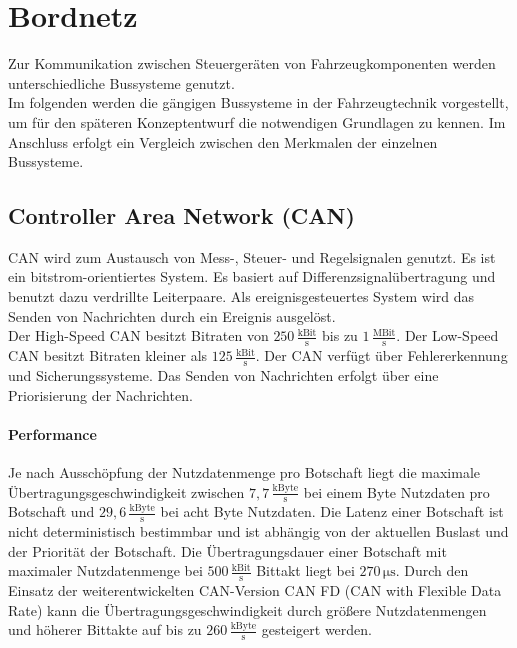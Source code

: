 \section{Bordnetz}
Zur Kommunikation zwischen Steuergeräten von Fahrzeugkomponenten werden unterschiedliche Bussysteme genutzt. \\
Im folgenden werden die gängigen Bussysteme in der Fahrzeugtechnik vorgestellt, um für den späteren Konzeptentwurf die notwendigen Grundlagen zu kennen. Im Anschluss erfolgt ein Vergleich zwischen den Merkmalen der einzelnen Bussysteme. \cite[Vgl. Seite 124 ff.]{Schauffele.2016}
\subsection{Controller Area Network (CAN)}
CAN wird zum Austausch von Mess-, Steuer- und Regelsignalen genutzt. Es ist ein bitstrom-orientiertes System. Es basiert auf Differenzsignalübertragung und benutzt dazu verdrillte Leiterpaare. Als ereignisgesteuertes System wird das Senden von Nachrichten durch ein Ereignis ausgelöst. \cite[Vgl. Seite 15 ff.]{Wolf.2018}\\
Der High-Speed CAN besitzt Bitraten von $ 250\,\frac{\mathrm{kBit}}{\mathrm{s}} $ bis zu $ 1\,\frac{\mathrm{MBit}}{\mathrm{s}}$.
Der Low-Speed CAN besitzt Bitraten kleiner als $ 125\,\frac{\mathrm{kBit}}{\mathrm{s}} $. 
Der CAN verfügt über Fehlererkennung und Sicherungssysteme. Das Senden von Nachrichten erfolgt über eine Priorisierung der Nachrichten. \cite[Vgl. Seite 57 ff.]{Zimmermann.2014}
\paragraph{Performance}
Je nach Ausschöpfung der Nutzdatenmenge pro Botschaft liegt die maximale Übertragungsgeschwindigkeit zwischen $ 7,7\,\frac{\mathrm{kByte}}{\mathrm{s}} $ bei einem Byte Nutzdaten pro Botschaft und $ 29,6\,\frac{\mathrm{kByte}}{\mathrm{s}} $ bei acht Byte Nutzdaten. Die Latenz einer Botschaft ist nicht deterministisch bestimmbar und ist abhängig von der aktuellen Buslast und der Priorität der Botschaft. Die Übertragungsdauer einer Botschaft mit maximaler Nutzdatenmenge bei $ 500\,\frac{\mathrm{kBit}}{\mathrm{s}} $ Bittakt liegt bei $ 270\,\mathrm{\mu s}$.
Durch den Einsatz der weiterentwickelten CAN-Version CAN FD (CAN with Flexible Data Rate) kann die Übertragungsgeschwindigkeit durch größere Nutzdatenmengen und höherer Bittakte auf bis zu $ 260\,\frac{\mathrm{kByte}}{\mathrm{s}} $ gesteigert werden. \cite[Vgl. Seite 76 ff.]{Zimmermann.2014}
